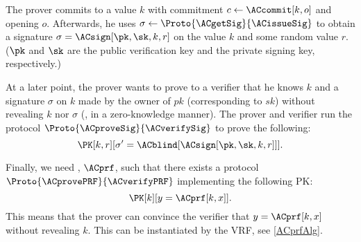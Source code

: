 
The prover commits to a value \(k\) with commitment \(c\gets \ACcommit[k, o]\) 
and opening \(o\).
Afterwards, he uses \(\sigma\gets \Proto{\ACgetSig}{\ACissueSig}\) to obtain a 
signature \(\sigma = \ACsign[\pk, \sk, k, r]\) on the value \(k\) and some 
random value \(r\).
(\(\pk\) and \(\sk\) are the public verification key and the private signing 
key, respectively.)

At a later point, the prover wants to prove to a verifier that he knows \(k\) and a signature \(\sigma\) on \(k\) made by the owner of \(pk\) (corresponding to \(sk\)) without revealing \(k\) nor \(\sigma\) (\ie, in a zero-knowledge manner).
The prover and verifier run the protocol \(\Proto{\ACproveSig}{\ACverifySig}\) 
to prove the following:
\begin{equation*}
  \PK[k, r][\sigma' = \ACblind[\ACsign[\pk, \sk, k, r]]].
\end{equation*}

Finally, we need , \(\ACprf\), such that there exists a protocol 
\(\Proto{\ACprovePRF}{\ACverifyPRF}\) implementing the following \ac{PK}:
\begin{equation*}
  \PK[k][y = \ACprf[k, x]].
\end{equation*}
This means that the prover can convince the verifier that \(y = \ACprf[k, x]\) 
without revealing \(k\).
This can be instantiated by the \textcite{DY-VRF} \ac{VRF}, see 
\cref{ACprfAlg}.



